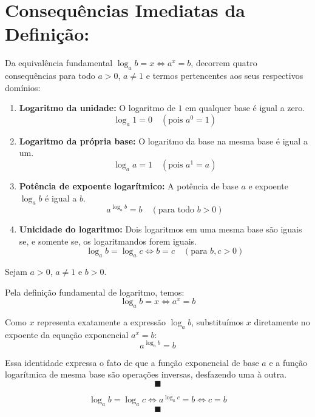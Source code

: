 \documentclass[12pt,a4paper]{report}
\begin{document}
	\section{Consequências Imediatas da Definição:}
	
	Da equivalência fundamental $\log_a b = x \iff a^x = b$, decorrem quatro consequências para todo $a > 0$, $a \neq 1$ e termos pertencentes aos seus respectivos domínios:
	
	\begin{destaque}[Consequências]
		\begin{enumerate}[label=\textbf{\arabic*.}]
			\item \textbf{Logaritmo da unidade:} O logaritmo de $1$ em qualquer base é igual a zero.
			$$\log_a 1 = 0 \quad (\text{pois } a^0 = 1)$$
			
			\item \textbf{Logaritmo da própria base:} O logaritmo da base na mesma base é igual a um.
			$$\log_a a = 1 \quad (\text{pois } a^1 = a)$$
			
			\item \textbf{Potência de expoente logarítmico:} A potência de base $a$ e expoente $\log_a b$ é igual a $b$.
			$$a^{\log_a b} = b \quad (\text{para todo } b > 0)$$
				
			\item \textbf{Unicidade do logaritmo:} Dois logaritmos em uma mesma base são iguais se, e somente se, os logaritmandos forem iguais.
			$$\log_a b = \log_a c \iff b = c \quad (\text{para } b, c > 0)$$		
			
		\end{enumerate}
	\end{destaque}
	
	\begin{destaque}
		Sejam $a > 0$, $a \neq 1$ e $b > 0$. 
		
		Pela definição fundamental de logaritmo, temos:
		$$\log_a b = x \iff a^x = b$$
		
		Como $x$ representa exatamente a expressão $\log_a b$, substituímos $x$ diretamente no expoente da equação exponencial $a^x = b$:
		$$a^{\log_a b} = b$$
		
		Essa identidade expressa o fato de que a função exponencial de base $a$ e a função logarítmica de mesma base são operações inversas, desfazendo uma à outra.
		$$\blacksquare$$
	\end{destaque}

		
	\begin{destaque}
		$$\log_a b = \log_a c \Longleftrightarrow a^{\log_a c} = b \Longleftrightarrow c=b$$
		$$\blacksquare$$
	\end{destaque}
	
\end{document}
